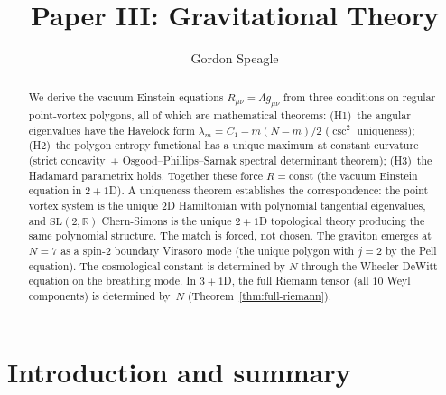









\title{\seriestitle\\[6pt]\large Paper III: Gravitational Theory}
\author{Gordon Speagle}
\date{}


\maketitle

\begin{abstract}
We derive the vacuum Einstein equations
$R_{\mu\nu} = \Lambda g_{\mu\nu}$ from three conditions on
regular point-vortex polygons, all of which are mathematical
theorems:
(H1)~the angular eigenvalues have the Havelock form
$\lambda_m = C_1 - m(N{-}m)/2$ ($\csc^2$ uniqueness);
(H2)~the polygon entropy functional has a unique maximum
at constant curvature (strict concavity~$+$
Osgood--Phillips--Sarnak spectral determinant theorem);
(H3)~the Hadamard parametrix holds.
Together these force $R = \mathrm{const}$
(the vacuum Einstein equation in $2{+}1$D).
A uniqueness theorem establishes the correspondence:
the point vortex system is the unique 2D Hamiltonian
with polynomial tangential eigenvalues,
and $\mathrm{SL}(2,\mathbb{R})$ Chern-Simons is the unique
$2{+}1$D topological theory producing the same polynomial
structure. The match is forced, not chosen.
The graviton emerges at $N = 7$ as a spin-$2$ boundary
Virasoro mode (the unique polygon with $j = 2$ by the
Pell equation).
The cosmological constant is determined by $N$ through the
Wheeler-DeWitt equation on the breathing mode.
In $3{+}1$D, the full Riemann tensor (all $10$ Weyl
components) is determined by~$N$
(Theorem~\ref{thm:full-riemann}).
\end{abstract}

\section{Introduction and summary}
\label{sec:intro-gravity}

